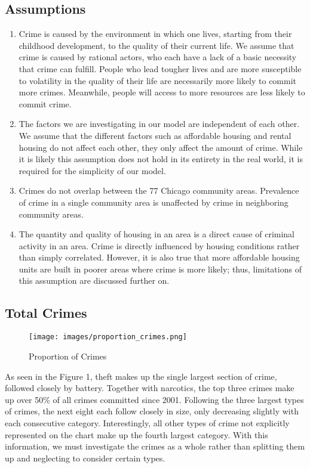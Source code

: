 \documentclass{article}
\begin{document}
\begin{onehalfspacing}
\subsection{Assumptions}
\begin{enumerate}
    \item Crime is caused by the environment in which one lives, starting from their childhood development, to the quality of their current life. We assume that crime is caused by rational actors, who each have a lack of a basic necessity that crime can fulfill. People who lead tougher lives and are more susceptible to volatility in the quality of their life are necessarily more likely to commit more crimes. Meanwhile, people will access to more resources are less likely to commit crime.
    \item The factors we are investigating in our model are independent of each other. We assume that the different factors such as affordable housing and rental housing do not affect each other, they only affect the amount of crime. While it is likely this assumption does not hold in its entirety in the real world, it is required for the simplicity of our model.
    \item Crimes do not overlap between the 77 Chicago community areas. Prevalence of crime in a single community area is unaffected by crime in neighboring community areas.
    \item The quantity and quality of housing in an area is a direct cause of criminal activity in an area. Crime is directly influenced by housing conditions rather than simply correlated. However, it is also true that more affordable housing units are built in poorer areas where crime is more likely; thus, limitations of this assumption are discussed further on.
\end{enumerate}

\subsection{Total Crimes}
\begin{figure}[H]
    \centering
    \centerline{\texttt{[image: images/proportion\_crimes.png]}}
    \caption{Proportion of Crimes}
\end{figure}
As seen in the Figure 1, theft makes up the single largest section of crime, followed closely by battery. Together with narcotics, the top three crimes make up over 50\% of all crimes committed since 2001. Following the three largest types of crimes, the next eight each follow closely in size, only decreasing slightly with each consecutive category. Interestingly, all other types of crime not explicitly represented on the chart make up the fourth largest category. With this information, we must investigate the crimes as a whole rather than splitting them up and neglecting to consider certain types.


\end{onehalfspacing}
\end{document}

